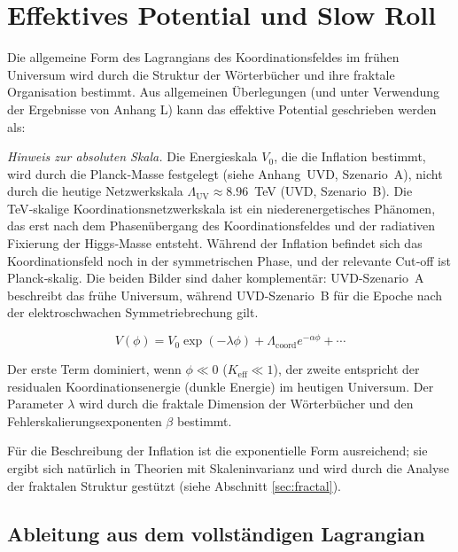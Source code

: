 \documentclass[12pt]{article}
\theoremstyle{remark}
\newcommand{\Keff}{K_{\mathrm{eff}}}
\begin{document}
	\section{Effektives Potential und Slow Roll}
	\label{sec:potential}
	
	Die allgemeine Form des Lagrangians des Koordinationsfeldes im frühen Universum wird durch die Struktur der Wörterbücher und ihre fraktale Organisation bestimmt. Aus allgemeinen Überlegungen (und unter Verwendung der Ergebnisse von Anhang L) kann das effektive Potential geschrieben werden als:
	
	\noindent\textit{Hinweis zur absoluten Skala.}
	Die Energieskala $V_0$, die die Inflation bestimmt, wird durch die Planck‑Masse festgelegt (siehe Anhang~UVD, Szenario~A), nicht durch die heutige Netzwerkskala $\Lambda_{\mathrm{UV}} \approx 8.96$~TeV (UVD, Szenario~B). Die TeV‑skalige Koordinationsnetzwerkskala ist ein niederenergetisches Phänomen, das erst nach dem Phasenübergang des Koordinationsfeldes und der radiativen Fixierung der Higgs‑Masse entsteht. Während der Inflation befindet sich das Koordinationsfeld noch in der symmetrischen Phase, und der relevante Cut‑off ist Planck‑skalig. Die beiden Bilder sind daher komplementär: UVD-Szenario~A beschreibt das frühe Universum, während UVD-Szenario~B für die Epoche nach der elektroschwachen Symmetriebrechung gilt.
	
	\begin{equation}
		V(\phi) = V_0 \exp\left( -\lambda \phi \right) + \Lambda_{\mathrm{coord}} e^{-\alpha \phi} + \cdots
		\label{eq:potential}
	\end{equation}
	
	Der erste Term dominiert, wenn $\phi \ll 0$ ($\Keff \ll 1$), der zweite entspricht der residualen Koordinationsenergie (dunkle Energie) im heutigen Universum. Der Parameter $\lambda$ wird durch die fraktale Dimension der Wörterbücher und den Fehlerskalierungsexponenten $\beta$ bestimmt.
	
	Für die Beschreibung der Inflation ist die exponentielle Form ausreichend; sie ergibt sich natürlich in Theorien mit Skaleninvarianz und wird durch die Analyse der fraktalen Struktur gestützt (siehe Abschnitt \ref{sec:fractal}).
	
	\subsection{Ableitung aus dem vollständigen Lagrangian}
	
\end{document}
